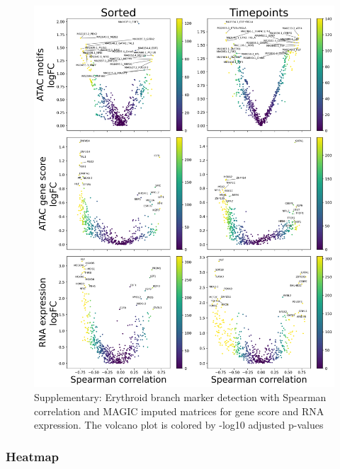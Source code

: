 \documentclass[a4paper]{article}
\begin{document}
\begin{figure}[!htb]
  \centering
  \includegraphics[width=\textwidth]{../figures/hematopoiesis/Basophil_40_109_smooth_magic_single_branch_volcanos_motifs.png}
  \caption{Supplementary: Erythroid branch marker detection with Spearman correlation and MAGIC imputed matrices for gene score and RNA expression. The volcano plot is colored by -log10 adjusted p-values}
\end{figure}

\FloatBarrier
\subsubsection{Heatmap}
\end{document}
